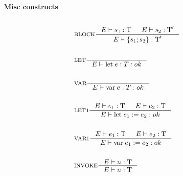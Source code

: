 \paragraph{Misc constructs}
\begin{align*}
\intertext{}
&\inference[BLOCK]{\Tenv s_1: \Tt & \Tenv s_2: \Tt'}
                 {\Tenv \{s_1; s_2\} : \Tt'}
\\\\
&\inference[LET]{}
                 {\Tenv \mathbin{\text{let}} \; e:T: ok}
\\\\
&\inference[VAR]{}
                 {\Tenv \mathbin{\text{var}} \; e:T: ok}
\\\\
&\inference[LET1]{\Tenv e_1: \Tt & \Tenv e_2: \Tt}
                 {\Tenv \mathbin{\text{let}} \; e_1 := e_2: ok}
\\\\
&\inference[VAR1]{\Tenv e_1: \Tt & \Tenv e_2: \Tt}
                 {\Tenv \mathbin{\text{var}} \; e_1 := e_2: ok}
\\\\
&\inference[INVOKE]{\Tenv n: \Tt}
                 {\Tenv n: \Tt}
\end{align*}